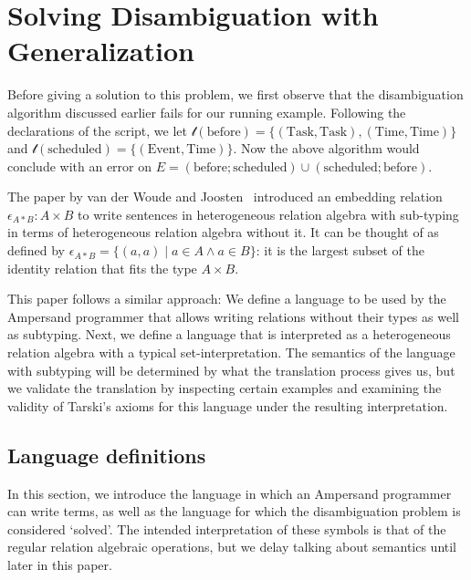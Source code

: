 \documentclass[12pt]{article}
\begin{document}
\section{Solving Disambiguation with Generalization}
Before giving a solution to this problem, we first observe that the disambiguation algorithm discussed earlier fails for our running example.
Following the declarations of the script, we let $\mathcal{t}(\mathrm{before}) = \{(\mathrm{Task}, \mathrm{Task}),(\mathrm{Time}, \mathrm{Time})\}$ and $\mathcal{t}(\mathrm{scheduled}) = \{(\mathrm{Event}, \mathrm{Time})\}$.
Now the above algorithm would conclude with an error on $E = (\mathrm{before};\mathrm{scheduled}) \cup (\mathrm{scheduled};\mathrm{before})$.

The paper by van der Woude and Joosten~\cite{Woude11} introduced an embedding relation $\epsilon_{A*B} : A \times B$ to write sentences in heterogeneous relation algebra with sub-typing in terms of heterogeneous relation algebra without it.
It can be thought of as defined by $\epsilon_{A*B} = \{(a,a) \mid a\in A \wedge a\in B\}$: it is the largest subset of the identity relation that fits the type $A\times B$.

This paper follows a similar approach: We define a language to be used by the Ampersand programmer that allows writing relations without their types as well as subtyping.
Next, we define a language that is interpreted as a heterogeneous relation algebra with a typical set-interpretation.
The semantics of the language with subtyping will be determined by what the translation process gives us, but we validate the translation by inspecting certain examples and examining the validity of Tarski's axioms for this language under the resulting interpretation.

\subsection{Language definitions}
In this section, we introduce the language in which an Ampersand programmer can write terms, as well as the language for which the disambiguation problem is considered `solved'.
The intended interpretation of these symbols is that of the regular relation algebraic operations, but we delay talking about semantics until later in this paper.
\end{document}
